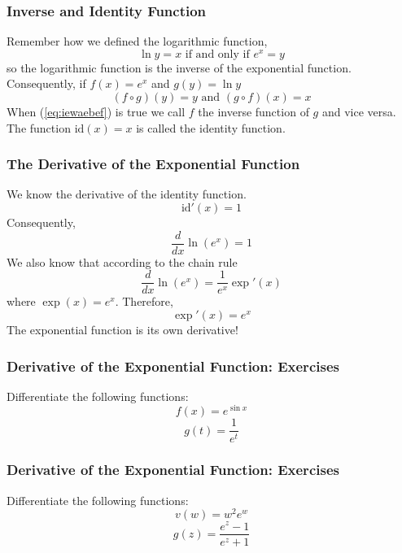 \documentclass[xcolor=dvipsnames,handout]{beamer}
\begin{document}
\begin{frame}
  \frametitle{Inverse and Identity Function}
Remember how we defined the logarithmic function,
\begin{equation}
  \label{eq:tieteiph}
  \ln{}y=x\mbox{ if and only if }e^{x}=y
\end{equation}
so the logarithmic function is the inverse of the exponential
function. Consequently, if $f(x)=e^{x}$ and $g(y)=\ln{}y$
\begin{equation}
  \label{eq:iewaebef}
  (f\circ{}g)(y)=y\mbox{ and }(g\circ{}f)(x)=x
\end{equation}
When (\ref{eq:iewaebef}) is true we call $f$ the \alert{inverse
  function} of $g$ and vice versa. The function $\mbox{id}(x)=x$ is called
the \alert{identity function}. 
\end{frame}

\begin{frame}
  \frametitle{The Derivative of the Exponential Function}
We know the derivative of the identity function.
\begin{equation}
  \label{eq:sivahzuw}
  \mbox{id}'(x)=1
\end{equation}
Consequently,
\begin{equation}
  \label{eq:zeejaixu}
  \frac{d}{dx}\ln\left(e^{x}\right)=1
\end{equation}
We also know that according to the chain rule
\begin{equation}
  \label{eq:iecheixo}
  \frac{d}{dx}\ln\left(e^{x}\right)=\frac{1}{e^{x}}\exp'(x)
\end{equation}
where $\exp(x)=e^{x}$. Therefore,
\begin{equation}
  \label{eq:zigaewai}
  \exp'(x)=e^{x}
\end{equation}
The exponential function is its own derivative!
\end{frame}

\begin{frame}
  \frametitle{Derivative of the Exponential Function: Exercises}
{\ubung} Differentiate the following functions:
\begin{equation}
  \label{eq:beetulae}
f(x)=e^{\sin{}x}  
\end{equation}
\begin{equation}
  \label{eq:aekephii}
g(t)=\frac{1}{e^{t}}  
\end{equation}
\end{frame}

\begin{frame}
  \frametitle{Derivative of the Exponential Function: Exercises}
{\ubung} Differentiate the following functions:
\begin{equation}
  \label{eq:uijeabai}
v(w)=w^{2}e^{w}  
\end{equation}
\begin{equation}
  \label{eq:ohzabeed}
g(z)=\frac{e^{z}-1}{e^{z}+1}  
\end{equation}
\end{frame}
\end{document}
